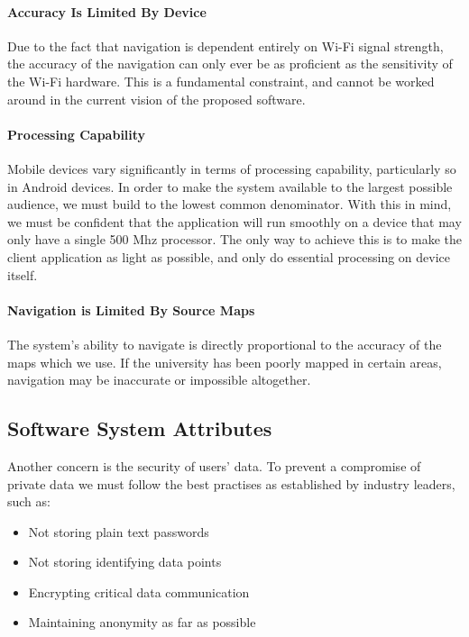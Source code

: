 \documentclass[12pt,a4paper]{article}
\begin{document}
			\paragraph{Accuracy Is Limited By Device}

				Due to the fact that navigation is dependent entirely on Wi-Fi signal
				strength, the accuracy of the navigation can only ever be as proficient
				as the sensitivity of the Wi-Fi hardware. This is a fundamental constraint,
				and cannot be worked around in the current vision of the proposed
				software.

			\paragraph{Processing Capability}

				Mobile devices vary significantly in terms of processing capability,
				particularly so in Android devices. In order to make the system
				available to the largest possible audience, we must build to the lowest
				common denominator. With this in mind, we must be confident that the
				application will run smoothly on a device that may only have a single
				500 Mhz processor. The only way to achieve this is to make the client
				application as light as possible, and only do essential processing on
				device itself.

				\paragraph{Navigation is Limited By Source Maps}

				The system's ability to navigate is directly proportional to the accuracy
				of the maps which we use. If the university has been poorly mapped in
				certain areas, navigation may be inaccurate or impossible altogether.

		\subsection{Software System Attributes}

			Another concern is the security of users' data. To prevent a compromise of
			private data we must follow the best practises as established by industry
			leaders, such as:

			\begin{itemize}
				\item Not storing plain text passwords
				\item Not storing identifying data points
				\item Encrypting critical data communication
				\item Maintaining anonymity as far as possible
			\end{itemize}
\end{document}
